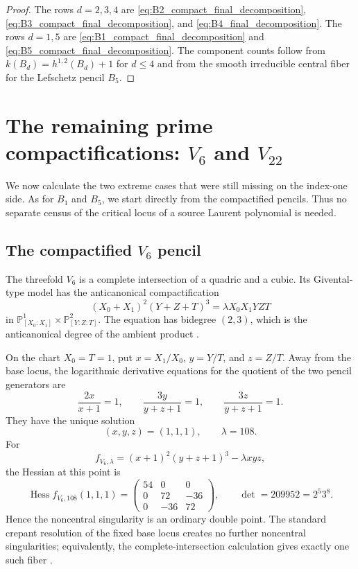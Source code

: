 \documentclass[11pt]{amsart}
\theoremstyle{definition}
\theoremstyle{remark}
\begin{document}
\begin{proof}
The rows $d=2,3,4$ are
\eqref{eq:B2_compact_final_decomposition},
\eqref{eq:B3_compact_final_decomposition}, and
\eqref{eq:B4_final_decomposition}.  The rows $d=1,5$ are
\eqref{eq:B1_compact_final_decomposition} and
\eqref{eq:B5_compact_final_decomposition}.  The component counts follow from
$k(B_d)=h^{1,2}(B_d)+1$ for $d\leq4$ and from the smooth irreducible central
fiber for the Lefschetz pencil $B_5$.
\end{proof}

\section{The remaining prime compactifications:
\texorpdfstring{$V_6$ and $V_{22}$}{V6 and V22}}
\label{sec:V6_V22_compactifications}

We now calculate the two extreme cases that were still missing on the
index-one side.  As for $B_1$ and $B_5$, we start directly from the
compactified pencils.  Thus no separate census of the critical locus of a
source Laurent polynomial is needed.

\subsection{The compactified \texorpdfstring{$V_6$}{V6} pencil}

The threefold $V_6$ is a complete intersection of a quadric and a cubic.
Its Givental-type model has the anticanonical compactification
\begin{equation}
\label{eq:V6_compact_pencil}
(X_0+X_1)^2(Y+Z+T)^3
=\lambda X_0X_1YZT
\end{equation}
in
$\mathbb P^1_{[X_0:X_1]}\times\mathbb P^2_{[Y:Z:T]}$.
The equation has bidegree $(2,3)$, which is the anticanonical degree of the
ambient product \cite{PrzyjalkowskiWeak,PrzyjalkowskiCY}.

On the chart $X_0=T=1$, put $x=X_1/X_0$, $y=Y/T$, and $z=Z/T$.  Away from
the base locus, the logarithmic derivative equations for the quotient of the
two pencil generators are
\[
\frac{2x}{x+1}=1,
\qquad
\frac{3y}{y+z+1}=1,
\qquad
\frac{3z}{y+z+1}=1.
\]
They have the unique solution
\begin{equation}
\label{eq:V6_compact_node}
(x,y,z)=(1,1,1),
\qquad
\lambda=108.
\end{equation}
For
\[
f_{V_6,\lambda}
=(x+1)^2(y+z+1)^3-\lambda xyz,
\]
the Hessian at this point is
\begin{equation}
\label{eq:V6_compact_hessian}
\operatorname{Hess}f_{V_6,108}(1,1,1)
=
\begin{pmatrix}
54&0&0\\
0&72&-36\\
0&-36&72
\end{pmatrix},
\qquad
\det=209952=2^5 3^8.
\end{equation}
Hence the noncentral singularity is an ordinary double point.  The standard
crepant resolution of the fixed base locus creates no further noncentral
singularities; equivalently, the complete-intersection calculation gives
exactly one such fiber \cite{Przyjalkowski2026}.
\end{document}
